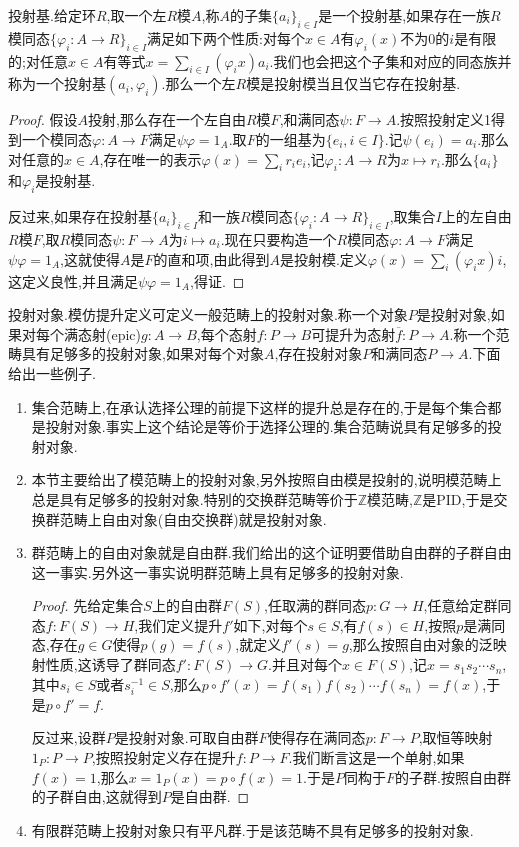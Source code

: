 投射基.给定环$R$,取一个左$R$模$A$,称$A$的子集$\{a_i\}_{i\in I}$是一个投射基,如果存在一族$R$模同态$\{\varphi_i:A\to R\}_{i\in I}$满足如下两个性质:对每个$x\in A$有$\varphi_i(x)$不为0的$i$是有限的;对任意$x\in A$有等式$x=\sum_{i\in I}(\varphi_ix)a_i$.我们也会把这个子集和对应的同态族并称为一个投射基$(a_i,\varphi_i)$.那么一个左$R$模是投射模当且仅当它存在投射基.
\begin{proof}
	
	假设$A$投射,那么存在一个左自由$R$模$F$,和满同态$\psi:F\to A$.按照投射定义1得到一个模同态$\varphi:A\to F$满足$\psi\varphi=1_A$.取$F$的一组基为$\{e_i,i\in I\}$.记$\psi(e_i)=a_i$.那么对任意的$x\in A$,存在唯一的表示$\varphi(x)=\sum_ir_ie_i$,记$\varphi_i:A\to R$为$x\mapsto r_i$.那么$\{a_i\}$和$\varphi_i$是投射基.
	
	反过来,如果存在投射基$\{a_i\}_{i\in I}$和一族$R$模同态$\{\varphi_i:A\to R\}_{i\in I}$,取集合$I$上的左自由$R$模$F$,取$R$模同态$\psi:F\to A$为$i\mapsto a_i$.现在只要构造一个$R$模同态$\varphi:A\to F$满足$\psi\varphi=1_A$,这就使得$A$是$F$的直和项,由此得到$A$是投射模.定义$\varphi(x)=\sum_i(\varphi_ix)i$,这定义良性,并且满足$\psi\varphi=1_A$,得证.
\end{proof}

投射对象.模仿提升定义可定义一般范畴上的投射对象.称一个对象$P$是投射对象,如果对每个满态射(epic)$g:A\to B$,每个态射$f:P\to B$可提升为态射$\overline{f}:P\to A$.称一个范畴具有足够多的投射对象,如果对每个对象$A$,存在投射对象$P$和满同态$P\to A$.下面给出一些例子.
\begin{enumerate}
	\item 集合范畴上,在承认选择公理的前提下这样的提升总是存在的,于是每个集合都是投射对象.事实上这个结论是等价于选择公理的.集合范畴说具有足够多的投射对象.
	\item 本节主要给出了模范畴上的投射对象,另外按照自由模是投射的,说明模范畴上总是具有足够多的投射对象.特别的交换群范畴等价于$\mathbb{Z}$模范畴,$\mathbb{Z}$是PID,于是交换群范畴上自由对象(自由交换群)就是投射对象.
	\item 群范畴上的自由对象就是自由群.我们给出的这个证明要借助自由群的子群自由这一事实.另外这一事实说明群范畴上具有足够多的投射对象.
	\begin{proof}
		
		先给定集合$S$上的自由群$F(S)$,任取满的群同态$p:G\to H$,任意给定群同态$f:F(S)\to H$,我们定义提升$f'$如下,对每个$s\in S$,有$f(s)\in H$,按照$p$是满同态,存在$g\in G$使得$p(g)=f(s)$,就定义$f'(s)=g$,那么按照自由对象的泛映射性质,这诱导了群同态$f':F(S)\to G$.并且对每个$x\in F(S)$,记$x=s_1s_2\cdots s_n$,其中$s_i\in S$或者$s_i^{-1}\in S$,那么$p\circ f'(x)=f(s_1)f(s_2)\cdots f(s_n)=f(x)$,于是$p\circ f'=f$.
		
		反过来,设群$P$是投射对象.可取自由群$F$使得存在满同态$p:F\to P$,取恒等映射$1_P:P\to P$,按照投射定义存在提升$f:P\to F$.我们断言这是一个单射,如果$f(x)=1$,那么$x=1_P(x)=p\circ f(x)=1$.于是$P$同构于$F$的子群.按照自由群的子群自由,这就得到$P$是自由群.
	\end{proof}
    \item 有限群范畴上投射对象只有平凡群.于是该范畴不具有足够多的投射对象.
\end{enumerate}

